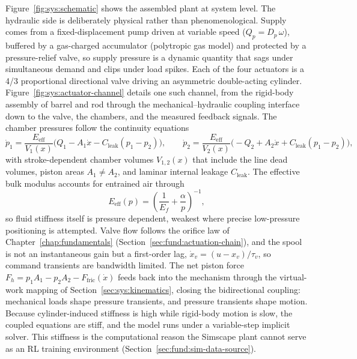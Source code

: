 Figure~\ref{fig:sys:schematic} shows the assembled plant at system
level. The hydraulic side is deliberately physical rather
than phenomenological. Supply comes from a fixed-displacement pump
driven at variable speed ($Q_p = D_p\,\omega$), buffered by a
gas-charged accumulator (polytropic gas model) and protected by a
pressure-relief valve, so supply pressure is a dynamic quantity that
sags under simultaneous demand and clips under load spikes. Each of the four
actuators is a 4/3 proportional directional valve driving an
asymmetric double-acting cylinder.
Figure~\ref{fig:sys:actuator-channel} details one such channel, from
the rigid-body assembly of barrel and rod through the
mechanical--hydraulic coupling interface down to the valve, the
chambers, and the measured feedback signals. The chamber pressures
follow the continuity equations
%
\begin{equation}
  \label{eq:sys:continuity}
  \dot{p}_1 = \frac{E_{\mathrm{eff}}}{V_1(x)}
    \bigl( Q_1 - A_1 \dot{x} - C_{\mathrm{leak}}(p_1 - p_2) \bigr),
  \qquad
  \dot{p}_2 = \frac{E_{\mathrm{eff}}}{V_2(x)}
    \bigl( -Q_2 + A_2 \dot{x} + C_{\mathrm{leak}}(p_1 - p_2) \bigr),
\end{equation}
%
with stroke-dependent chamber volumes $V_{1,2}(x)$ that include the
line dead volumes, piston areas $A_1 \neq A_2$, and laminar internal
leakage $C_{\mathrm{leak}}$. The effective bulk modulus accounts for
entrained air through
%
\begin{equation}
  \label{eq:sys:bulk}
  E_{\mathrm{eff}}(p) =
  \left( \frac{1}{E_f} + \frac{\alpha}{p} \right)^{-1},
\end{equation}
%
so fluid stiffness itself is pressure dependent, weakest where precise low-pressure positioning is attempted. Valve flow follows the
orifice law of Chapter~\ref{chap:fundamentals}
(Section~\ref{sec:fund:actuation-chain}), and the spool is not an instantaneous
gain but a first-order lag, $\dot{x}_v = (u - x_v)/\tau_v$, so command
transients are bandwidth limited. The net piston force
$F_h = p_1 A_1 - p_2 A_2 - F_{\mathrm{fric}}(\dot{x})$ feeds back into
the mechanism through the virtual-work mapping of
Section~\ref{sec:sys:kinematics}, closing the bidirectional coupling:
mechanical loads shape pressure transients, and pressure transients
shape motion. Because cylinder-induced stiffness is high while
rigid-body motion is slow, the coupled equations are stiff, and the
model runs under a variable-step implicit solver. This stiffness is the
computational reason the Simscape plant cannot serve as an RL training
environment (Section~\ref{sec:fund:sim-data-source}).

